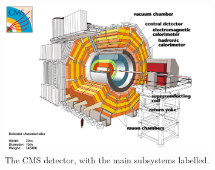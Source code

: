 
\begin{figure}[htbp]
  \begin{center}
  \includegraphics[width=0.8\textwidth]{Figures/detector/CMSlabelled}
  \caption{The \ac{CMS} detector, with the main subsystems labelled.
}
  \label{fig:CMS}
  \end{center}
\end{figure}

